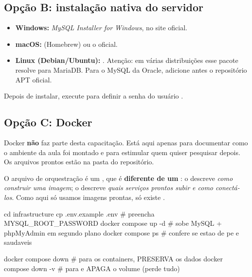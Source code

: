 \subsection{Opção B: instalação nativa do servidor}

\begin{itemize}
    \item \textbf{Windows:} \emph{MySQL Installer for Windows}, no site oficial.
    \item \textbf{macOS:}  (Homebrew) ou o
           oficial.
    \item \textbf{Linux (Debian/Ubuntu):} .
          Atenção: em várias distribuições esse pacote resolve para MariaDB.
          Para o MySQL da Oracle, adicione antes o repositório APT oficial.
\end{itemize}

Depois de instalar, execute  para
definir a senha do usuário .

\subsection{Opção C: Docker}

\begin{aviso}
Docker \textbf{não} faz parte desta capacitação. Está aqui apenas para
documentar como o ambiente da aula foi montado e para estimular quem quiser
pesquisar depois. Os arquivos prontos estão na pasta 
do repositório.
\end{aviso}

O arquivo de orquestração é um , que é \textbf{diferente
de um }: o  descreve \emph{como
construir uma imagem}; o  descreve \emph{quais serviços
prontos subir e como conectá-los}. Como aqui só usamos imagens prontas, só
existe .

\begin{bashcode}[caption={Subindo o ambiente},label={lst:compose-up}]
cd infrastructure
cp .env.example .env      # preencha MYSQL_ROOT_PASSWORD
docker compose up -d      # sobe MySQL + phpMyAdmin em segundo plano
docker compose ps         # confere se estao de pe e saudaveis
\end{bashcode}

\begin{bashcode}[caption={Derrubando o ambiente},label={lst:compose-down}]
docker compose down       # para os containers, PRESERVA os dados
docker compose down -v    # para e APAGA o volume (perde tudo)
\end{bashcode}

